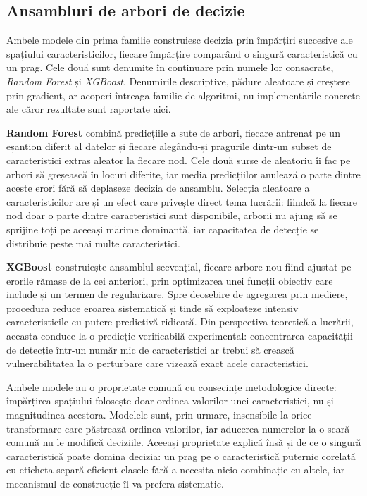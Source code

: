 \subsection{Ansambluri de arbori de decizie}\label{subsec:arbori}

Ambele modele din prima familie construiesc decizia prin împărțiri succesive ale spațiului caracteristicilor, fiecare împărțire comparând o singură caracteristică cu un prag. Cele două sunt denumite în continuare prin numele lor consacrate, \textit{Random Forest} și \textit{XGBoost}. Denumirile descriptive, pădure aleatoare și creștere prin gradient, ar acoperi întreaga familie de algoritmi, nu implementările concrete ale căror rezultate sunt raportate aici.

\textbf{Random Forest} \cite{breiman2001random} combină predicțiile a sute de arbori, fiecare antrenat pe un eșantion diferit al datelor și fiecare alegându-și pragurile dintr-un subset de caracteristici extras aleator la fiecare nod. Cele două surse de aleatoriu îi fac pe arbori să greșească în locuri diferite, iar media predicțiilor anulează o parte dintre aceste erori fără să deplaseze decizia de ansamblu. Selecția aleatoare a caracteristicilor are și un efect care privește direct tema lucrării: fiindcă la fiecare nod doar o parte dintre caracteristici sunt disponibile, arborii nu ajung să se sprijine toți pe aceeași mărime dominantă, iar capacitatea de detecție se distribuie peste mai multe caracteristici.

\textbf{XGBoost} \cite{chen2016xgboost} construiește ansamblul secvențial, fiecare arbore nou fiind ajustat pe erorile rămase de la cei anteriori, prin optimizarea unei funcții obiectiv care include și un termen de regularizare. Spre deosebire de agregarea prin mediere, procedura reduce eroarea sistematică și tinde să exploateze intensiv caracteristicile cu putere predictivă ridicată. Din perspectiva teoretică a lucrării, aceasta conduce la o predicție verificabilă experimental: concentrarea capacității de detecție într-un număr mic de caracteristici ar trebui să crească vulnerabilitatea la o perturbare care vizează exact acele caracteristici.

Ambele modele au o proprietate comună cu consecințe metodologice directe: împărțirea spațiului folosește doar ordinea valorilor unei caracteristici, nu și magnitudinea acestora. Modelele sunt, prin urmare, insensibile la orice transformare care păstrează ordinea valorilor, iar aducerea numerelor la o scară comună nu le modifică deciziile. Aceeași proprietate explică însă și de ce o singură caracteristică poate domina decizia: un prag pe o caracteristică puternic corelată cu eticheta separă eficient clasele fără a necesita nicio combinație cu altele, iar mecanismul de construcție îl va prefera sistematic.

